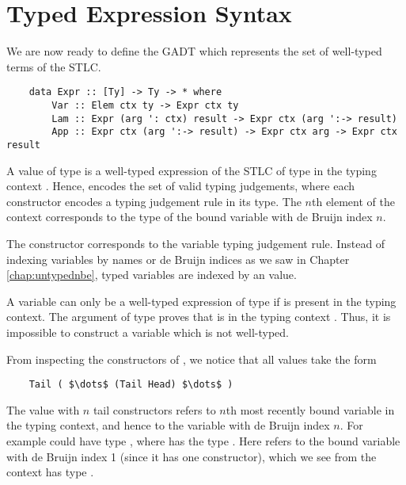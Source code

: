 
\section{Typed Expression Syntax}
\label{sect:typedsyntax}

We are now ready to define the  GADT which represents the set of well-typed terms of the STLC.

\begin{lstlisting}
    data Expr :: [Ty] -> Ty -> * where
        Var :: Elem ctx ty -> Expr ctx ty
        Lam :: Expr (arg ': ctx) result -> Expr ctx (arg ':-> result)
        App :: Expr ctx (arg ':-> result) -> Expr ctx arg -> Expr ctx result 
\end{lstlisting}

A value of type  is a well-typed expression of the STLC of type  in the typing context . Hence,  encodes the set of valid typing judgements, where each constructor encodes a typing judgement rule in its type. The $n$th element of the context corresponds to the type of the bound variable with de Bruijn index $n$.

The  constructor corresponds to the variable typing judgement rule. Instead of indexing variables by names or de Bruijn indices as we saw in Chapter \ref{chap:untypednbe}, typed variables are indexed by an  value.


A variable can only be a well-typed expression of type  if  is present in the typing context. The argument of type  proves that  is in the typing context . Thus, it is impossible to construct a variable which is not well-typed.

From inspecting the constructors of , we notice that all  values take the form 

\begin{lstlisting}
    Tail ( $\dots$ (Tail Head) $\dots$ ) 
\end{lstlisting}

The  value with $n$ tail constructors refers to $n$th most recently bound variable in the typing context, and hence to the variable with de Bruijn index $n$. For example  could have type , where  has the type . Here  refers to the bound variable with de Bruijn index 1 (since it has one  constructor), which we see from the context has type .

